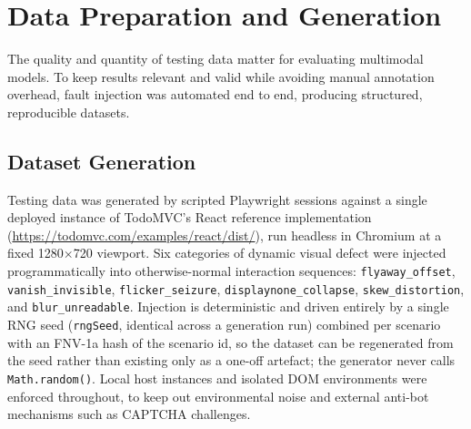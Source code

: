 \section{Data Preparation and Generation}
\label{sec:data_prep}
The quality and quantity of testing data matter for evaluating multimodal models. To keep results relevant and valid while avoiding manual annotation overhead, fault injection was automated end to end, producing structured, reproducible datasets.

\subsection{Dataset Generation}
\label{sec:data_prep-generation}
Testing data was generated by scripted Playwright sessions against a single deployed instance of TodoMVC's React reference implementation (\url{https://todomvc.com/examples/react/dist/}), run headless in Chromium at a fixed \num{1280}$\times$\num{720} viewport. Six categories of dynamic visual defect were injected programmatically into otherwise-normal interaction sequences: \texttt{flyaway\_offset}, \texttt{vanish\_invisible}, \texttt{flicker\_seizure}, \texttt{displaynone\_collapse}, \texttt{skew\_distortion}, and \texttt{blur\_unreadable}. Injection is deterministic and driven entirely by a single RNG seed (\texttt{rngSeed}, identical across a generation run) combined per scenario with an FNV-1a hash of the scenario id, so the dataset can be regenerated from the seed rather than existing only as a one-off artefact; the generator never calls \texttt{Math.random()}. Local host instances and isolated DOM environments were enforced throughout, to keep out environmental noise and external anti-bot mechanisms such as CAPTCHA challenges.

